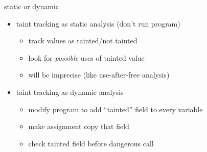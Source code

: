 \begin{frame}{static or dynamic}
\begin{itemize}
    \item taint tracking as static analysis (don't run program)
        \begin{itemize}
        \item track values as tainted/not tainted
        \item look for \textit{possible} uses of tainted value
        \item will be imprecise (like use-after-free analysis)
        \end{itemize}
    \item taint tracking as dynamic analysis
        \begin{itemize}
        \item modify program to add ``tainted'' field to every variable
        \item make assignment copy that field
        \item check tainted field before dangerous call
        \end{itemize}
    \end{itemize}
\end{frame}
